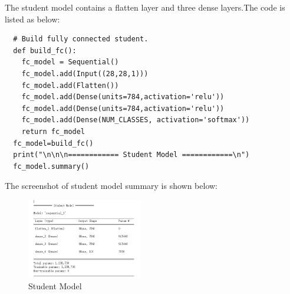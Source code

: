 \documentclass[conference]{IEEEtran}
\begin{document}
  The student model contains a flatten layer and three dense layers.The code is listed as below:
  \begin{lstlisting}
  # Build fully connected student.
  def build_fc():
    fc_model = Sequential()
    fc_model.add(Input((28,28,1)))
    fc_model.add(Flatten())
    fc_model.add(Dense(units=784,activation='relu'))
    fc_model.add(Dense(units=784,activation='relu'))
    fc_model.add(Dense(NUM_CLASSES, activation='softmax'))
    return fc_model
  fc_model=build_fc()
  print("\n\n\n============ Student Model ============\n")
  fc_model.summary()
  \end{lstlisting} \par
  The screenshot of student model summary is shown below:
  \begin{figure}[h] 
      \centering
      \includegraphics[width=0.45\textwidth]{./graphs/Student_MNIST.png}
      \caption{Student Model}
      \label{Fig.t1q3e}
  \end{figure}
\end{document}

